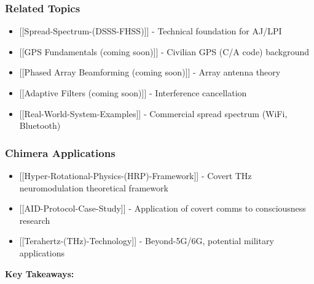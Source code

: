 \subsubsection{Related Topics}\label{related-topics}

\begin{itemize}
\tightlist
\item
  {[}{[}Spread-Spectrum-(DSSS-FHSS){]}{]} - Technical foundation for
  AJ/LPI
\item
  {[}{[}GPS Fundamentals (coming soon){]}{]} - Civilian GPS (C/A code)
  background
\item
  {[}{[}Phased Array Beamforming (coming soon){]}{]} - Array antenna
  theory
\item
  {[}{[}Adaptive Filters (coming soon){]}{]} - Interference cancellation
\item
  {[}{[}Real-World-System-Examples{]}{]} - Commercial spread spectrum
  (WiFi, Bluetooth)
\end{itemize}

\subsubsection{Chimera Applications}\label{chimera-applications}

\begin{itemize}
\tightlist
\item
  {[}{[}Hyper-Rotational-Physics-(HRP)-Framework{]}{]} - Covert THz
  neuromodulation theoretical framework
\item
  {[}{[}AID-Protocol-Case-Study{]}{]} - Application of covert comms to
  consciousness research
\item
  {[}{[}Terahertz-(THz)-Technology{]}{]} - Beyond-5G/6G, potential
  military applications
\end{itemize}

\textbf{Key Takeaways:}

